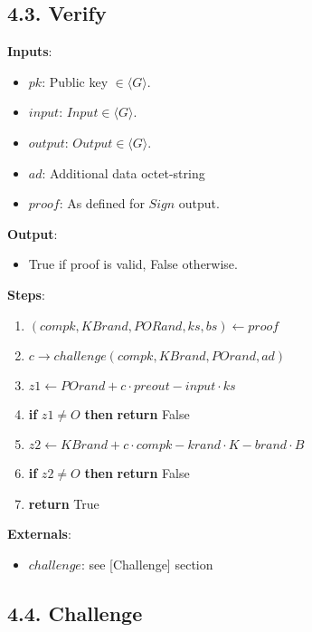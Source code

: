 \documentclass[
]{article}
\providecommand{\tightlist}{%
  \setlength{\itemsep}{0pt}\setlength{\parskip}{0pt}}
\begin{document}
\hypertarget{verify-1}{%
\subsection{4.3. Verify}\label{verify-1}}

\textbf{Inputs}:

\begin{itemize}
\tightlist
\item
  \(pk\): Public key \(\in \langle G \rangle\).
\item
  \(input\): \(Input \in \langle G \rangle\).
\item
  \(output\): \(Output \in \langle G \rangle\).
\item
  \(ad\): Additional data octet-string
\item
  \(proof\): As defined for \(Sign\) output.
\end{itemize}

\textbf{Output}:

\begin{itemize}
\tightlist
\item
  True if proof is valid, False otherwise.
\end{itemize}

\textbf{Steps}:

\begin{enumerate}
\def\labelenumi{\arabic{enumi}.}
\tightlist
\item
  \((compk, KBrand, PORand, ks, bs) \leftarrow proof\)
\item
  \(c \rightarrow challenge(compk, KBrand, POrand, ad)\)
\item
  \(z1 \leftarrow POrand + c \cdot preout - input \cdot ks\)
\item
  \textbf{if} \(z1 \neq O\) \textbf{then} \textbf{return} False
\item
  \(z2 \leftarrow KBrand + c \cdot compk - krand \cdot K - brand \cdot B\)
\item
  \textbf{if} \(z2 \neq O\) \textbf{then} \textbf{return} False
\item
  \textbf{return} True
\end{enumerate}

\textbf{Externals}:

\begin{itemize}
\tightlist
\item
  \(challenge\): see {[}Challenge{]} section
\end{itemize}

\hypertarget{challenge}{%
\subsection{4.4. Challenge}\label{challenge}}
\end{document}
